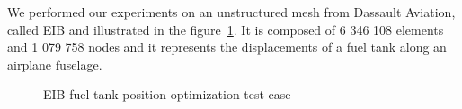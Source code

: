 \documentclass{IOS-Book-Article}
\begin{document}
We performed our experiments on an unstructured mesh from Dassault Aviation, called EIB and illustrated in the figure~\ref{fig:reservoir}.
It is composed of 6 346 108 elements and 1 079 758 nodes and it represents the displacements of a fuel tank along an airplane fuselage.
\begin{figure}[htp]
 \centering
 \caption{EIB fuel tank position optimization test case}
 \label{fig:reservoir}
\end{figure}
\end{document}
